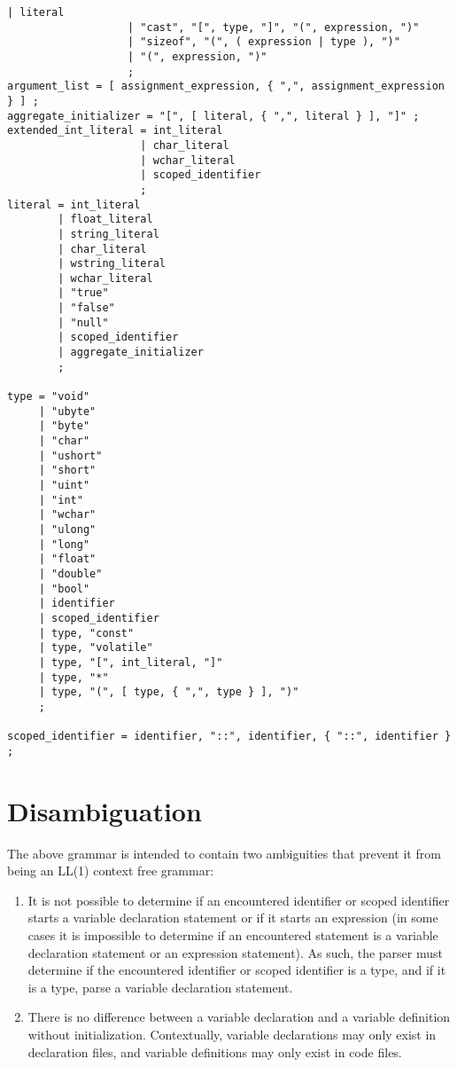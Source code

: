 \documentclass[letterpaper,12pt]{book}
\begin{document}
\begin{lstlisting}[breaklines=true]
                   | literal
                   | "cast", "[", type, "]", "(", expression, ")"
                   | "sizeof", "(", ( expression | type ), ")"
                   | "(", expression, ")"
                   ;
argument_list = [ assignment_expression, { ",", assignment_expression } ] ;
aggregate_initializer = "[", [ literal, { ",", literal } ], "]" ;
extended_int_literal = int_literal
                     | char_literal
                     | wchar_literal
                     | scoped_identifier
                     ;
literal = int_literal
        | float_literal
        | string_literal
        | char_literal
        | wstring_literal
        | wchar_literal
        | "true"
        | "false"
        | "null"
        | scoped_identifier
        | aggregate_initializer
        ;

type = "void"
     | "ubyte"
     | "byte"
     | "char"
     | "ushort"
     | "short"
     | "uint"
     | "int"
     | "wchar"
     | "ulong"
     | "long"
     | "float"
     | "double"
     | "bool"
     | identifier
     | scoped_identifier
     | type, "const"
     | type, "volatile"
     | type, "[", int_literal, "]"
     | type, "*"
     | type, "(", [ type, { ",", type } ], ")"
     ;

scoped_identifier = identifier, "::", identifier, { "::", identifier } ;
\end{lstlisting}

\section{Disambiguation}

The above grammar is intended to contain two ambiguities that prevent it from being an LL(1) context free grammar:

\begin{enumerate}

	\item It is not possible to determine if an encountered identifier or scoped identifier starts a variable declaration statement or if it starts an expression (in some cases it is impossible to determine if an encountered statement is a variable declaration statement or an expression statement). As such, the parser must determine if the encountered identifier or scoped identifier is a type, and if it is a type, parse a variable declaration statement.
	
	\item There is no difference between a variable declaration and a variable definition without initialization. Contextually, variable declarations may only exist in declaration files, and variable definitions may only exist in code files.
\end{enumerate}
\end{document}
